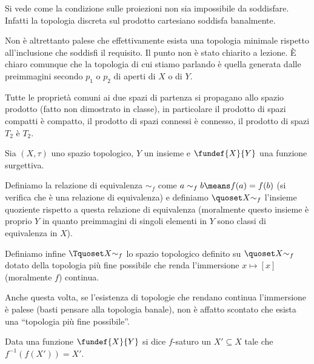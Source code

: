\begin{oss}
Si vede come la condizione sulle proiezioni non sia impossibile da soddisfare. Infatti la topologia discreta sul prodotto cartesiano soddisfa banalmente.

Non è altrettanto palese che effettivamente esista una topologia minimale rispetto all'inclusione che soddisfi il requisito. Il punto non è stato chiarito a lezione. È chiaro comunque che la topologia di cui stiamo parlando è quella generata dalle preimmagini secondo $p_1$ o $p_2$ di aperti di $X$ o di $Y$.
\end{oss}

\begin{oss}
Tutte le proprietà comuni ai due spazi di partenza si propagano allo spazio prodotto (fatto non dimostrato in classe), in particolare il prodotto di spazi compatti è compatto, il prodotto di spazi connessi è connesso, il prodotto di spazi $T_2$ è $T_2$.
\end{oss}

\begin{defn}
Sia $(X,\tau)$ uno spazio topologico, $Y$ un insieme e $\fundef{X}{Y}$ una funzione surgettiva.

Definiamo la relazione di equivalenza $\sim_f$ come $a\sim_f b \means f(a)=f(b)$ (si verifica che è una relazione di equivalenza) e definiamo $\quoset X{\sim_f}$ l'insieme quoziente rispetto a questa relazione di equivalenza (moralmente questo insieme è proprio $Y$ in quanto preimmagini di singoli elementi in $Y$ sono classi di equivalenza in $X$).

Definiamo infine $\Tquoset X{\sim_f}$ lo spazio topologico definito su $\quoset X{\sim_f}$ dotato della topologia più fine possibile che renda l'immersione $x \mapsto [x]$ (moralmente $f$) continua.
\end{defn}

\begin{oss}
Anche questa volta, se l'esistenza di topologie che rendano continua l'immersione è palese (basti pensare alla topologia banale), non è affatto scontato che esista una ``topologia più fine possibile''.
\end{oss}

\begin{defn}
Data una funzione $\fundef{X}{Y}$ si dice $f$-saturo un $X'\subseteq X$ tale che $f^{-1}(f(X'))=X'$.
\end{defn}

